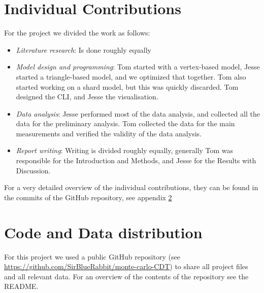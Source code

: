 \documentclass{article}
\begin{document}
\section{Individual Contributions}
For the project we divided the work as follows:
\begin{itemize}
    \item \textit{Literature research}: Is done roughly equally
    \item \textit{Model design and programming}: Tom started with a vertex-based model, Jesse started a triangle-based model, and we optimized that together. Tom also started working on a shard model, but this was quickly discarded. Tom designed the CLI, and Jesse the visualisation.
    \item \textit{Data analysis}: Jesse performed most of the data analysis, and collected all the data for the preliminary analysis. Tom collected the data for the main measurements and verified the validity of the data analysis.
    \item \textit{Report writing}: Writing is divided roughly equally, generally Tom was responsible for the Introduction and Methods, and Jesse for the Results with Discussion.
\end{itemize}
For a very detailed overview of the individual contributions, they can be found in the commits of the GitHub repository, see appendix \ref{sec:coderepo}

\section{Code and Data distribution} \label{sec:coderepo}
For this project we used a public GitHub repository (see \url{https://github.com/SirBlueRabbit/monte-carlo-CDT}) to share all project files and all relevant data.
For an overview of the contents of the repository see the \textsc{README}.
\end{document}
